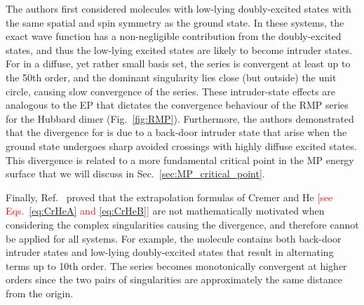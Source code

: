 \documentclass[aps,prb,reprint,noshowkeys,superscriptaddress]{revtex4-1}
\newcommand{\titou}[1]{\textcolor{red}{#1}}
\begin{document}
The authors first considered molecules with low-lying doubly-excited states with the same spatial
and spin symmetry as the ground state. \cite{Olsen_2000}
In these systems, the exact wave function has a non-negligible contribution from the doubly-excited states, 
and thus the low-lying excited states are likely to become intruder states. 
For  in a diffuse, yet rather small basis set, the series is convergent at least up to the 50th order, and
the dominant singularity lies close (but outside) the unit circle, causing slow convergence of the series.
These intruder-state effects are analogous to the EP that dictates the convergence behaviour of 
the RMP series for the Hubbard dimer (Fig.~\ref{fig:RMP}).
Furthermore, the authors demonstrated that the divergence for  is due to a back-door intruder state
that arise when the ground state undergoes sharp avoided crossings with highly diffuse excited states.
This divergence is related to a more fundamental critical point in the MP energy surface that we will
discuss in Sec.~\ref{sec:MP_critical_point}.

Finally, Ref.~ proved that the extrapolation formulas of Cremer and He \cite{Cremer_1996} 
\titou{[see Eqs.~\eqref{eq:CrHeA} and \eqref{eq:CrHeB}]} are not mathematically motivated when considering the complex 
singularities causing the divergence, and therefore cannot be applied for all systems.
For example, the  molecule contains both back-door intruder states and low-lying doubly-excited states that
result in alternating terms up to 10th order. 
The series becomes monotonically convergent at higher orders since
the two pairs of singularities are approximately the same distance from the origin.
\end{document}
